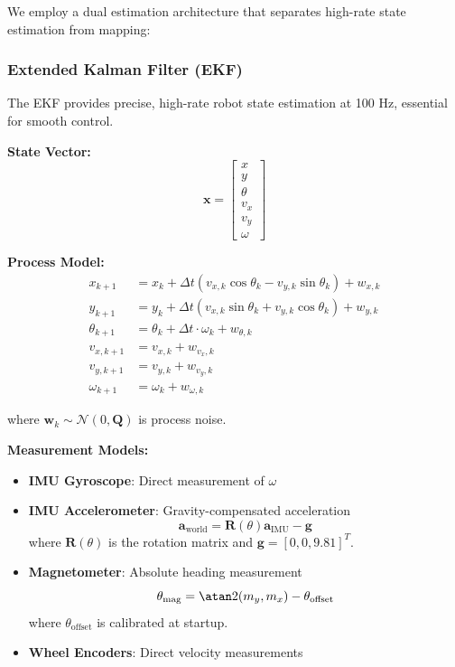 \documentclass[11pt]{article}
\begin{document}
We employ a dual estimation architecture that separates high-rate state estimation from mapping:

\subsubsection{Extended Kalman Filter (EKF)}

The EKF provides precise, high-rate robot state estimation at 100 Hz, essential for smooth control.

\textbf{State Vector:}
\[
\mathbf{x} = \begin{bmatrix} x \\ y \\ \theta \\ v_x \\ v_y \\ \omega \end{bmatrix}
\]

\textbf{Process Model:}
\begin{align}
x_{k+1} &= x_k + \Delta t (v_{x,k} \cos\theta_k - v_{y,k} \sin\theta_k) + w_{x,k} \\
y_{k+1} &= y_k + \Delta t (v_{x,k} \sin\theta_k + v_{y,k} \cos\theta_k) + w_{y,k} \\
\theta_{k+1} &= \theta_k + \Delta t \cdot \omega_k + w_{\theta,k} \\
v_{x,k+1} &= v_{x,k} + w_{v_x,k} \\
v_{y,k+1} &= v_{y,k} + w_{v_y,k} \\
\omega_{k+1} &= \omega_k + w_{\omega,k}
\end{align}

where $\mathbf{w}_k \sim \mathcal{N}(0, \mathbf{Q})$ is process noise.

\textbf{Measurement Models:}

\begin{itemize}
    \item \textbf{IMU Gyroscope}: Direct measurement of $\omega$
    \item \textbf{IMU Accelerometer}: Gravity-compensated acceleration
    \[
    \mathbf{a}_{\text{world}} = \mathbf{R}(\theta) \mathbf{a}_{\text{IMU}} - \mathbf{g}
    \]
    where $\mathbf{R}(\theta)$ is the rotation matrix and $\mathbf{g} = [0, 0, 9.81]^T$.
    \item \textbf{Magnetometer}: Absolute heading measurement
    \[
    \theta_{\text{mag}} = \atan2(m_y, m_x) - \theta_{\text{offset}}
    \]
    where $\theta_{\text{offset}}$ is calibrated at startup.
    \item \textbf{Wheel Encoders}: Direct velocity measurements
\end{itemize}
\end{document}
